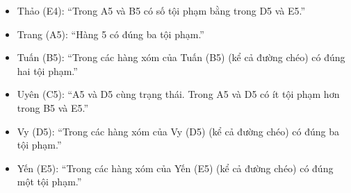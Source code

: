 \begin{itemize}
  \item Thảo (E4): ``Trong A5 và B5 có số tội phạm bằng trong D5 và E5.''
  \item Trang (A5): ``Hàng 5 có đúng ba tội phạm.''
  \item Tuấn (B5): ``Trong các hàng xóm của Tuấn (B5) (kể cả đường chéo) có đúng hai tội phạm.''
  \item Uyên (C5): ``A5 và D5 cùng trạng thái. Trong A5 và D5 có ít tội phạm hơn trong B5 và E5.''
  \item Vy (D5): ``Trong các hàng xóm của Vy (D5) (kể cả đường chéo) có đúng ba tội phạm.''
  \item Yến (E5): ``Trong các hàng xóm của Yến (E5) (kể cả đường chéo) có đúng một tội phạm.''
\end{itemize}
